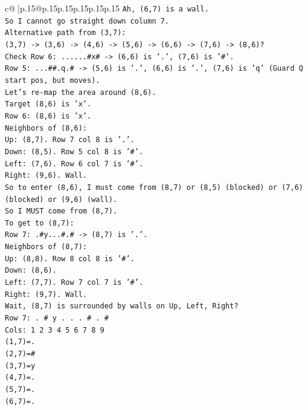 \documentclass{article}
\begin{document}
{\begin{supertabular}{c@{$\;$}|p{.15\linewidth}@{}p{.15\linewidth}p{.15\linewidth}p{.15\linewidth}p{.15\linewidth}p{.15\linewidth}}
{{{\texttt{Ah, (6,7) is a wall.} \\
\texttt{So I cannot go straight down column 7.} \\
\texttt{Alternative path from (3,7):} \\
\texttt{(3,7) {-}> (3,6) {-}> (4,6) {-}> (5,6) {-}> (6,6) {-}> (7,6) {-}> (8,6)?} \\
\texttt{Check Row 6: ......\#x\# {-}> (6,6) is '.', (7,6) is '\#'.} \\
\texttt{Row 5: ...\#\#.q.\# {-}> (5,6) is '.', (6,6) is '.', (7,6) is 'q' (Guard Q start pos, but moves).} \\
\texttt{Let's re{-}map the area around (8,6).} \\
\texttt{Target (8,6) is 'x'.} \\
\texttt{Row 6: (8,6) is 'x'.} \\
\texttt{Neighbors of (8,6):} \\
\texttt{Up: (8,7). Row 7 col 8 is '.'.} \\
\texttt{Down: (8,5). Row 5 col 8 is '\#'.} \\
\texttt{Left: (7,6). Row 6 col 7 is '\#'.} \\
\texttt{Right: (9,6). Wall.} \\
\texttt{So to enter (8,6), I must come from (8,7) or (8,5) (blocked) or (7,6) (blocked) or (9,6) (wall).} \\
\texttt{So I MUST come from (8,7).} \\
\texttt{To get to (8,7):} \\
\texttt{Row 7: .\#y...\#.\# {-}> (8,7) is '.'.} \\
\texttt{Neighbors of (8,7):} \\
\texttt{Up: (8,8). Row 8 col 8 is '\#'.} \\
\texttt{Down: (8,6).} \\
\texttt{Left: (7,7). Row 7 col 7 is '\#'.} \\
\texttt{Right: (9,7). Wall.} \\
\texttt{Wait, (8,7) is surrounded by walls on Up, Left, Right?} \\
\texttt{Row 7: . \# y . . . \# . \#} \\
\texttt{Cols: 1 2 3 4 5 6 7 8 9} \\
\texttt{(1,7)=.} \\
\texttt{(2,7)=\#} \\
\texttt{(3,7)=y} \\
\texttt{(4,7)=.} \\
\texttt{(5,7)=.} \\
\texttt{(6,7)=.} \\
}}}
\end{supertabular}}
\end{document}
